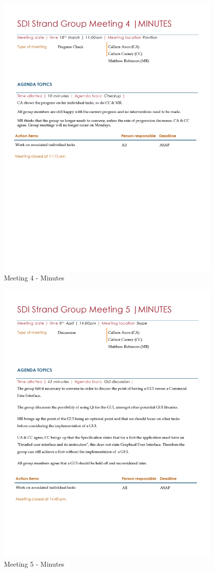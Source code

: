 \documentclass[
  english,
  a4paper,
,tablecaptionabove
]{scrartcl}
\begin{document}
\begin{figure}
\centering
\includegraphics{images/meeting-minutes/meeting-4.png}
\caption{Meeting 4 - Minutes}
\end{figure}

\begin{figure}
\centering
\includegraphics{images/meeting-minutes/meeting-5.png}
\caption{Meeting 5 - Minutes}
\end{figure}

\newpage
\end{document}
